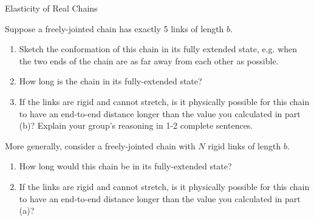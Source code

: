\begin{activity}[extension]{Elasticity of Real Chains}
\begin{model}
\end{model}

\begin{ctqs}

	\question Suppose a freely-jointed chain has exactly 5 links of length $b$.
	
		\begin{enumerate}
			\item Sketch the conformation of this chain in its fully extended state, e.g. when the two ends of the chain are as far away from each other as possible.
			
				\begin{solution}[0.5in]
				\end{solution}
			
			\item How long is the chain in its fully-extended state?
			
				\begin{solution}[0.5in]
				\end{solution}
			
			\item If the links are rigid and cannot stretch, is it physically possible for this chain to have an end-to-end distance longer than the value you calculated in part (b)?  Explain your group's reasoning in 1-2 complete sentences.
			
				\begin{solution}[1.75in]
				\end{solution}
			
		\end{enumerate}
		
	\question More generally, consider a freely-jointed chain with $N$ rigid links of length $b$.
	
		\begin{enumerate}
		
			\item How long would this chain be in its fully-extended state?
			
				\begin{solution}[0.5in]
				\end{solution}
			
			\item If the links are rigid and cannot stretch, is it physically possible for this chain to have an end-to-end distance longer than the value you calculated in part (a)?
			
				\begin{solution}[0.5in]
				\end{solution}
			

\end{enumerate}
\end{ctqs}
\end{activity}
